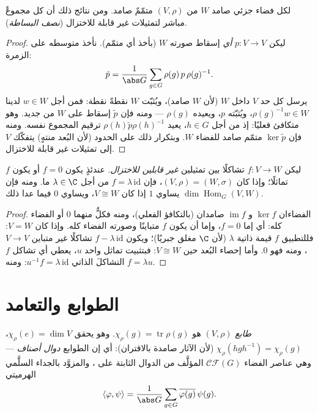 \begin{theorem}[ماشكه]\label{thm:b3:representations:maschke}
لكل فضاء جزئي صامد $W$ من  $(V, \rho)$ متمّمٌ صامد. ومن نتائج
ذلك أن كل  مجموعٌ مباشر لتمثيلات غير قابلة للاختزال
(\emph{نصف البساطة}).
\end{theorem}

\begin{proof}
ليكن $p \colon V \to V$ \emph{أي} إسقاط صورته $W$ (بأخذ أي متمّم). نأخذ
متوسطه على الزمرة:
\[
\tilde p = \frac1{\abs G}\sum_{g \in G} \rho(g)\,p\,\rho(g)^{-1}.
\]
يرسل كل حد $V$ داخل $W$ (لأن $W$ صامد)، ويُثبّت $W$ نقطةً نقطة:
فمن أجل $w \in W$ لدينا $\rho(g)^{-1}w \in W$، ويُثبّته $p$، ويعيده $\rho(g)$
--- ومنه فإن $\tilde p$ إسقاط على $W$ من جديد. وهو متكافئ فعليًا:
إذ من أجل $h \in G$، يعيد $\rho(h)\tilde p\rho(h)^{-1}$ ترقيم المجموع نفسه. ومنه فإن
$\ker
\tilde p$ متمّم صامد للفضاء $W$. وبتكرار ذلك على الحدود (لأن البُعد
منتهٍ) يتفكّك $V$ إلى تمثيلات غير قابلة للاختزال.
\end{proof}

\begin{theorem}\label{thm:b3:representations:schur}
ليكن $f \colon V \to W$ تشاكلًا بين تمثيلين \emph{غير قابلين للاختزال}.
عندئذٍ يكون $f = 0$ أو يكون $f$ تماثلًا؛ وإذا كان $(V,\rho) = (W,\sigma)$، فإن
$f = \lambda\,\mathrm{id}$ من أجل $\lambda \in \C$ ما. ومنه فإن $\dim\operatorname{Hom}_G(V, W)$ يساوي $1$ إذا
كان $V \cong W$، ويساوي $0$ فيما عدا ذلك.
\end{theorem}

\begin{proof}
الفضاءان $\ker f$ و $\operatorname{im} f$ صامدان (بالتكافؤ الفعلي)، ومنه فكلٌّ
منهما $0$ أو الفضاء كله: أي إما $f = 0$، وإما أن يكون $f$ متباينًا
وصورته الفضاء كله. وإذا كان $V = W$: فللتطبيق $f$ قيمة ذاتية
$\lambda$ (لأن $\C$ مغلق جبريًا)؛ ويكون $f - \lambda\,\mathrm{id}$ تشاكلًا غير متباين
$V \to V$، ومنه فهو $0$. وأما إحصاء البُعد حين $V \cong W$:
فبتثبيت تماثل واحد $u$، يعطي أي تشاكل $f$ التشاكلَ الذاتي $u^{-1}f = \lambda\,\mathrm{id}$:
ومنه $f =
\lambda u$.
\end{proof}

\section{الطوابع والتعامد}

\begin{definition}\label{def:b3:representations:character}
\emph{طابع}  $(V, \rho)$ هو $\chi_\rho(g) = \operatorname{tr}\rho(g)$. وهو يحقق
$\chi_\rho(e) = \dim V$، $\chi_\rho(hgh^{-1}) = \chi_\rho(g)$ (لأن الآثار صامدة بالاقتران): أي إن الطوابع
\emph{دوال أصناف} --- وهي عناصر الفضاء $\mathcal{CF}(G)$
المؤلَّف من الدوال الثابتة على ، والمزوَّد بالجداء
السلَّمي الهرميتي
\[
\langle \varphi, \psi\rangle = \frac1{\abs G}\sum_{g \in G}
\overline{\varphi(g)}\,\psi(g).
\]
\end{definition}

